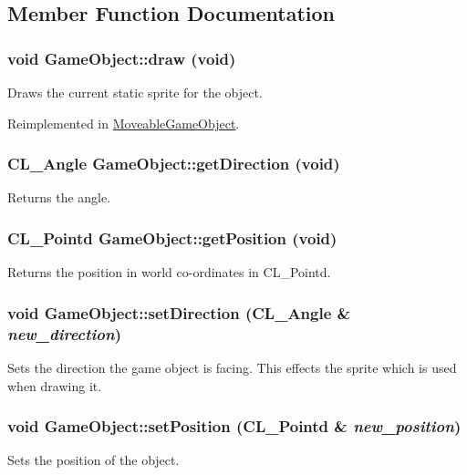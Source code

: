 \subsection{Member Function Documentation}
\hypertarget{classGameObject_abb64143e72358beb808db22182517802}{
\subsubsection[{draw}]{\setlength{\rightskip}{0pt plus 5cm}void GameObject::draw (void)}}
\label{classGameObject_abb64143e72358beb808db22182517802}
Draws the current static sprite for the object. 

Reimplemented in \hyperlink{classMoveableGameObject_a6110e3bcfb088cfaa53bc81ce220bab1}{MoveableGameObject}.\hypertarget{classGameObject_a456901f9f0b261b206db248960633e50}{
\subsubsection[{getDirection}]{\setlength{\rightskip}{0pt plus 5cm}CL\_\-Angle GameObject::getDirection (void)}}
\label{classGameObject_a456901f9f0b261b206db248960633e50}
Returns the angle. \hypertarget{classGameObject_adfc89f23ef6d0819c183f1c26bb27e58}{
\subsubsection[{getPosition}]{\setlength{\rightskip}{0pt plus 5cm}CL\_\-Pointd GameObject::getPosition (void)}}
\label{classGameObject_adfc89f23ef6d0819c183f1c26bb27e58}
Returns the position in world co-\/ordinates in CL\_\-Pointd. \hypertarget{classGameObject_a0eabb72240499a1878b420b5c3f0ecf3}{
\subsubsection[{setDirection}]{\setlength{\rightskip}{0pt plus 5cm}void GameObject::setDirection (CL\_\-Angle \& {\em new\_\-direction})}}
\label{classGameObject_a0eabb72240499a1878b420b5c3f0ecf3}
Sets the direction the game object is facing. This effects the sprite which is used when drawing it. \hypertarget{classGameObject_a4fd1eeb91d5a220dde7b8574be19b651}{
\subsubsection[{setPosition}]{\setlength{\rightskip}{0pt plus 5cm}void GameObject::setPosition (CL\_\-Pointd \& {\em new\_\-position})}}
\label{classGameObject_a4fd1eeb91d5a220dde7b8574be19b651}
Sets the position of the object.


